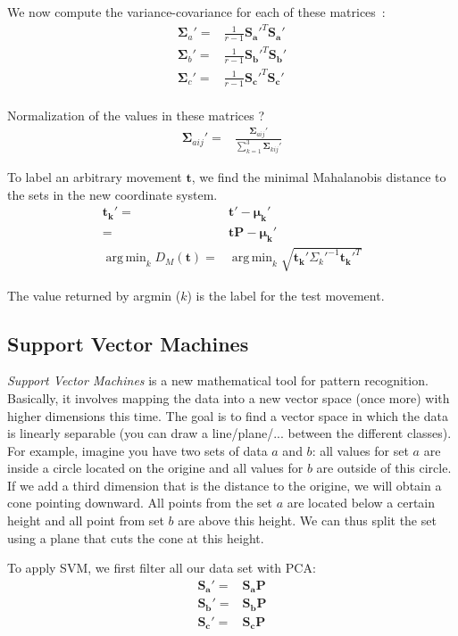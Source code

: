 \documentclass[11pt,twocolumn]{amsart} %
\DeclareMathOperator*{\argmin}{arg\,min}
\newcommand{\ve}[1]{\boldsymbol{#1}}
\newcommand{\ma}[1]{\boldsymbol{#1}}
\begin{document}
We now compute the variance-covariance for each of these matrices~:
\begin{align*}
  \ma\Sigma_a' = & \frac{1}{r-1}\ma{S_{a}'}^T\ma{S_{a}'} \\
  \ma\Sigma_b' = & \frac{1}{r-1}\ma{S_{b}'}^T\ma{S_{b}'} \\
  \ma\Sigma_c' = & \frac{1}{r-1}\ma{S_{c}'}^T\ma{S_{c}'} \\
\end{align*}

Normalization of the values in these matrices ?
\begin{align*}
  \ma\Sigma_{aij}' = & \frac{\ma\Sigma_{aij}'}{\sum_{k=1}^3 \ma\Sigma_{kij}'}
\end{align*}

To label an arbitrary movement $\ve{t}$, we find the minimal Mahalanobis distance to the sets in the new coordinate system.
\begin{align*}
  \ve{t_k'} = & \ve{t'} - \ve{\mu_k'} \\
            = & \ve{t}\ma{P} - \ve{\mu_k'} \\
  \argmin_{k} D_M(\ve{t}) = & \argmin_{k} \sqrt{\ve{t_k'}\Sigma_k'^{-1}\ve{t_k'}^T}
\end{align*}

The value returned by argmin ($k$) is the label for the test movement.

\subsection{Support Vector Machines}

\emph{Support Vector Machines} is a new mathematical tool for pattern recognition. Basically, it involves mapping the data into a new vector space (once more) with higher dimensions this time. The goal is to find a vector space in which the data is linearly separable (you can draw a line/plane/... between the different classes). For example, imagine you have two sets of data $a$ and $b$: all values for set $a$ are inside a circle located on the origine and all values for $b$ are outside of this circle. If we add a third dimension that is the distance to the origine, we will obtain a cone pointing downward. All points from the set $a$ are located below a certain height and all point from set $b$ are above this height. We can thus split the set using a plane that cuts the cone at this height.

To apply SVM, we first filter all our data set with PCA:
\begin{align*}
  \ma{S_{a}'} = & \ma{S_a}\ma{P} \\
  \ma{S_{b}'} = & \ma{S_b}\ma{P} \\
  \ma{S_{c}'} = & \ma{S_c}\ma{P} \\
\end{align*}
\end{document}
